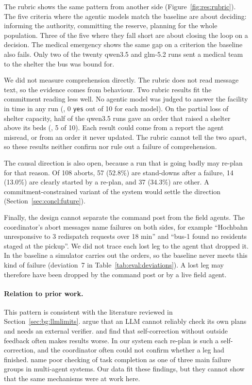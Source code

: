 The rubric shows the same pattern from another side
(Figure~\ref{fig:res:rubric}). The five criteria where the agentic models
match the baseline are about deciding: informing the authority, committing the
reserve, planning for the whole population. Three of the five where they fall short
are about closing the loop on a decision. The medical emergency shows
the same gap on a criterion the baseline also fails. Only two of the twenty
qwen3.5 and glm-5.2 runs sent a medical team to the shelter the bus was
bound for.

We did not measure comprehension directly. The rubric does not read message
text, so the evidence comes from behaviour. Two rubric results fit the
commitment reading less well. No agentic model was judged to answer the
facility in time in any run (, 0
\texttt{yes} out of 10 for each model). On the partial loss of shelter
capacity, half of the qwen3.5 runs gave an order that raised a shelter above
its beds (, 5 of 10). Each result
could come from a report the agent misread, or from an order it never
updated. The rubric cannot tell the two apart, so these results neither
confirm nor rule out a failure of comprehension.

The causal direction is also open, because a run that is going badly may
re-plan for that reason. Of 108 aborts, 57 (52.8\%) are stand-downs after a
failure, 14 (13.0\%) are clearly started by a re-plan, and 37 (34.3\%) are
other. A commitment-constrained variant of the system would settle the
direction (Section~\ref{sec:concl:future}).

Finally, the design cannot separate the command post from the field agents.
The coordinator's abort messages name failures on both sides, for example
``Hochbahn unresponsive to 3 redispatch requests over 18 min'' and ``bus-1
found no residents staged at the pickup''. We did not trace each lost leg to
the agent that dropped it. In the baseline a simulator carries out the orders,
so the baseline never meets this kind of failure (deviation~7 in
Table~\ref{tab:eval:deviations}). A lost leg may therefore have been dropped
by the command post or by a live field agent.

\paragraph{Relation to prior work.} This pattern is consistent with the
literature reviewed in Section~\ref{sec:bg:llmlimits}.
\textcite{kambhampati2024} argue that an LLM cannot reliably check its own
plans and needs an external verifier. \textcite{huang2024} and
\textcite{stechly2024} find that self-correction without outside feedback
often makes results worse. In our system each re-plan is such a
self-correction, and the coordinator often could not confirm whether a leg had
finished. \textcite{cemri2025} name poor checking of task completion as one of
three main failure groups in multi-agent systems. Our data fit these findings,
but they cannot show that the same mechanisms were at work here.

